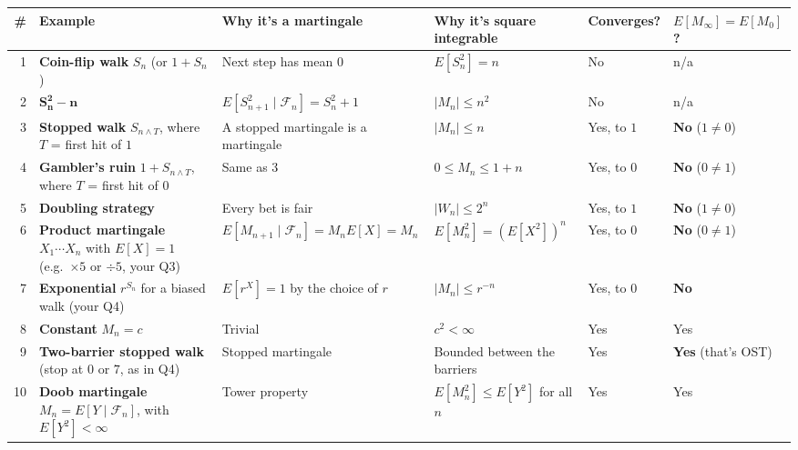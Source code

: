 \documentclass[8pt,letterpaper]{extarticle}
\begin{document}
{\scriptsize
\setlength{\tabcolsep}{3pt}
\renewcommand{\arraystretch}{1.1}
\begin{tabularx}{\textwidth}{@{}r >{\raggedright\arraybackslash}X >{\raggedright\arraybackslash}X >{\raggedright\arraybackslash}X l l@{}}
\toprule
\# & Example & Why it's a martingale & Why it's square integrable & Converges? & $E[M_\infty]=E[M_0]$? \\
\midrule
1  & \textbf{Coin-flip walk} $S_n$ (or $1+S_n$) & Next step has mean $0$ & $E[S_n^2]=n$ & No & n/a \\
2  & $\mathbf{S_n^2-n}$ & $E[S_{n+1}^2\mid\mathcal{F}_n]=S_n^2+1$ & $|M_n|\le n^2$ & No & n/a \\
3  & \textbf{Stopped walk} $S_{n\wedge T}$, where $T$ = first hit of $1$ & A stopped martingale is a martingale & $|M_n|\le n$ & Yes, to $1$ & \textbf{No} ($1\neq0$) \\
4  & \textbf{Gambler's ruin} $1+S_{n\wedge T}$, where $T$ = first hit of $0$ & Same as 3 & $0\le M_n\le 1+n$ & Yes, to $0$ & \textbf{No} ($0\neq1$) \\
5  & \textbf{Doubling strategy} & Every bet is fair & $|W_n|\le 2^n$ & Yes, to $1$ & \textbf{No} ($1\neq0$) \\
6  & \textbf{Product martingale} $X_1\cdots X_n$ with $E[X]=1$ (e.g.\ $\times5$ or $\div5$, your Q3) & $E[M_{n+1}\mid\mathcal{F}_n]=M_n E[X]=M_n$ & $E[M_n^2]=(E[X^2])^n$ & Yes, to $0$ & \textbf{No} ($0\neq1$) \\
7  & \textbf{Exponential} $r^{S_n}$ for a biased walk (your Q4) & $E[r^X]=1$ by the choice of $r$ & $|M_n|\le r^{-n}$ & Yes, to $0$ & \textbf{No} \\
8  & \textbf{Constant} $M_n=c$ & Trivial & $c^2<\infty$ & Yes & Yes \\
9  & \textbf{Two-barrier stopped walk} (stop at $0$ or $7$, as in Q4) & Stopped martingale & Bounded between the barriers & Yes & \textbf{Yes} (that's OST) \\
10 & \textbf{Doob martingale} $M_n=E[Y\mid\mathcal{F}_n]$, with $E[Y^2]<\infty$ & Tower property & $E[M_n^2]\le E[Y^2]$ for all $n$ & Yes & Yes \\
\bottomrule
\end{tabularx}}
\end{document}
